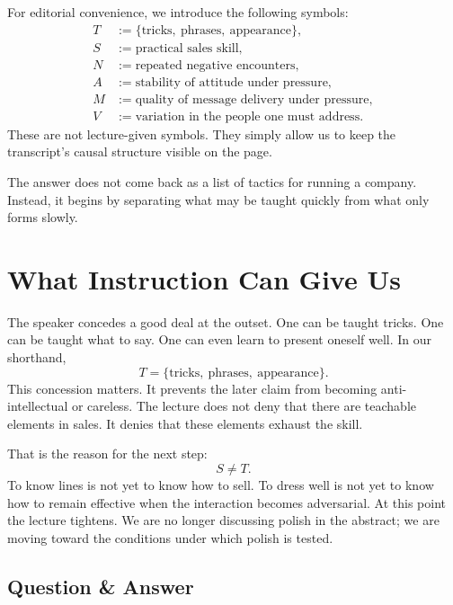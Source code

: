 \begin{definition}
For editorial convenience, we introduce the following symbols:
\begin{align}
T &:= \{\text{tricks},\ \text{phrases},\ \text{appearance}\}, \\
S &:= \text{practical sales skill}, \\
N &:= \text{repeated negative encounters}, \\
A &:= \text{stability of attitude under pressure}, \\
M &:= \text{quality of message delivery under pressure}, \\
V &:= \text{variation in the people one must address}.
\end{align}
These are not lecture-given symbols. They simply allow us to keep the transcript's causal structure visible on the page.
\end{definition}

The answer does not come back as a list of tactics for running a company. Instead, it begins by separating what may be taught quickly from what only forms slowly.

\section{What Instruction Can Give Us}

The speaker concedes a good deal at the outset. One can be taught tricks. One can be taught what to say. One can even learn to present oneself well. In our shorthand,
\begin{equation}
T=\{\text{tricks},\ \text{phrases},\ \text{appearance}\}.
\end{equation}
This concession matters. It prevents the later claim from becoming anti-intellectual or careless. The lecture does not deny that there are teachable elements in sales. It denies that these elements exhaust the skill.

That is the reason for the next step:
\begin{equation}
S \neq T.
\end{equation}
To know lines is not yet to know how to sell. To dress well is not yet to know how to remain effective when the interaction becomes adversarial. At this point the lecture tightens. We are no longer discussing polish in the abstract; we are moving toward the conditions under which polish is tested.

\subsection{Question \& Answer}

